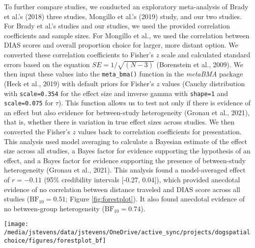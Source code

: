 \documentclass[
  pub,floatsintext]{apa6}
\begin{document}
To further compare studies, we conducted an exploratory meta-analysis of Brady et al.'s (2018) three studies, Mongillo et al.'s (2019) study, and our two studies. For Brady et al.'s studies and our studies, we used the provided correlation coefficients and sample sizes. For Mongillo et al., we used the correlation between DIAS scores and overall proportion choice for larger, more distant option. We converted these correlation coefficients to Fisher's \(z\) scale and calculated standard errors based on the equation \(SE = 1 / \sqrt{(N - 3)}\) (Borenstein et al., 2009). We then input these values into the \texttt{meta\_bma()} function in the \emph{metaBMA} package (Heck et al., 2019) with default priors for Fisher's \(z\) values (Cauchy distribution with \texttt{scale=0.354} for the effect size and inverse gamma with \texttt{shape=1} and \texttt{scale=0.075} for \(\tau\)). This function allows us to test not only if there is evidence of an effect but also evidence for between-study heterogeneity (Gronau et al., 2021), that is, whether there is variation in true effect sizes across studies. We then converted the Fisher's \(z\) values back to correlation coefficients for presentation. This analysis used model averaging to calculate a Bayesian estimate of the effect size across all studies, a Bayes factor for evidence supporting the hypothesis of an effect, and a Bayes factor for evidence supporting the presence of between-study heterogeneity (Gronau et al., 2021). This analysis found a model-averaged effect of \(r = -0.11\) (95\% credibility intervals {[}-0.27, 0.04{]}), which provided anecdotal evidence of no correlation between distance traveled and DIAS score across all studies (\(\mathrm{BF}_{\textrm{10}} = 0.51\); Figure \ref{fig:forestplot}). It also found anecdotal evidence of no between-group heterogeneity (\(\mathrm{BF}_{\textrm{10}} = 0.74\)).

\begin{figure*}

{\centering \texttt{[image: /media/jstevens/data/jstevens/OneDrive/active\_sync/projects/dogspatialchoice/figures/forestplot\_bf]} 

}

\caption{Forest plot of meta-analysis. Plot shows effect sizes (correlation coefficients, $r$) and 95\% confidence intervals around effect sizes for Brady et al. (2018), Mongillo et al. (2019), and current studies. Black dots represent effect sizes different from 0, grey dots represent effect sizes not different from 0, and the black diamond represents the Bayesian model-averaged effect size over all studies.}\label{fig:forestplot}
\end{figure*}
\end{document}
